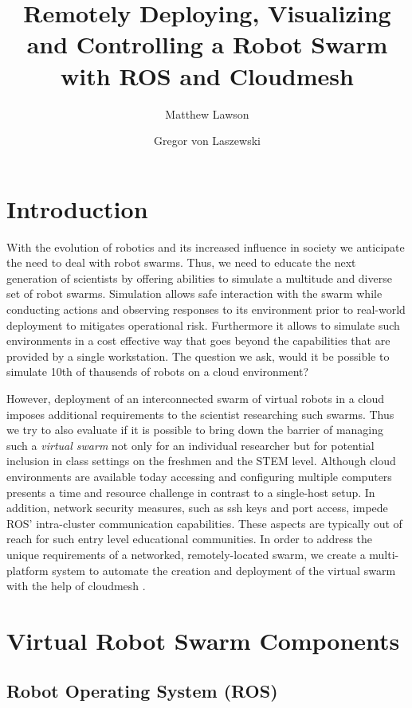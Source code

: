 \documentclass[9pt,twocolumn,twoside]{../../styles/osajnl}
\title{Remotely Deploying, Visualizing and Controlling a Robot Swarm with ROS and Cloudmesh}
\author[1]{Matthew Lawson}
\author[1,*]{Gregor von Laszewski}
\affil[1]{School of Informatics and Computing, Bloomington, IN 47408, U.S.A.}
\affil[*]{Corresponding authors: laszewski@gmail.com}
\begin{document}
\maketitle

\section{Introduction}
With the evolution of robotics and its increased influence in society we anticipate the need to deal with robot swarms. Thus, we need to educate the next generation of scientists by offering abilities to simulate a multitude and diverse set of robot swarms. Simulation allows safe interaction with the swarm while conducting actions and observing responses to its environment prior to real-world deployment to mitigates operational risk. Furthermore it allows to simulate such environments in a cost effective way that goes beyond the capabilities that are provided by a single workstation. The question we ask, would it be possible to simulate 10th of thausends of robots on a cloud environment?

However, deployment of an interconnected swarm of virtual robots in a cloud imposes additional requirements to the scientist researching such swarms. Thus we try to also evaluate if it is possible to bring down the barrier of managing such a {\em virtual swarm} not only for an individual researcher but for potential inclusion in class settings on the freshmen and the STEM level. Although cloud environments are available today accessing and configuring multiple computers presents a time and resource challenge in contrast to a single-host setup.  In addition, network security measures, such as ssh keys and port access, impede ROS' intra-cluster communication capabilities.  These aspects are typically out of reach for such entry level educational communities. In order to address the unique requirements of a networked, remotely-located swarm, we create a multi-platform system to automate the creation and deployment of the virtual swarm with the help of cloudmesh \cite{??}.

\section{Virtual Robot Swarm Components}

\subsection{Robot Operating System (ROS) \cite{paper2}}
\end{document}
